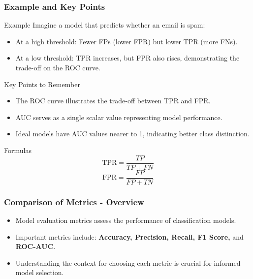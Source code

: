\documentclass[aspectratio=169]{beamer}
\begin{document}
\begin{frame}[fragile]
  \frametitle{Example and Key Points}
  \begin{block}{Example}
    Imagine a model that predicts whether an email is spam:
    \begin{itemize}
      \item At a high threshold: Fewer FPs (lower FPR) but lower TPR (more FNs).
      \item At a low threshold: TPR increases, but FPR also rises, demonstrating the trade-off on the ROC curve.
    \end{itemize}
  \end{block}

  \begin{block}{Key Points to Remember}
    \begin{itemize}
      \item The ROC curve illustrates the trade-off between TPR and FPR.
      \item AUC serves as a single scalar value representing model performance.
      \item Ideal models have AUC values nearer to 1, indicating better class distinction.
    \end{itemize}
  \end{block}

  \begin{block}{Formulas}
    \begin{equation}
      \text{TPR} = \frac{TP}{TP + FN}
    \end{equation}
    \begin{equation}
      \text{FPR} = \frac{FP}{FP + TN}
    \end{equation}
  \end{block}
\end{frame}

\begin{frame}[fragile]
    \frametitle{Comparison of Metrics - Overview}
    \begin{itemize}
        \item Model evaluation metrics assess the performance of classification models.
        \item Important metrics include: 
        \textbf{Accuracy, Precision, Recall, F1 Score,} and \textbf{ROC-AUC}.
        \item Understanding the context for choosing each metric is crucial for informed model selection.
    \end{itemize}
\end{frame}
\end{document}
